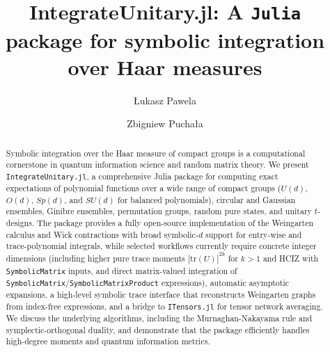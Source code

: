 \documentclass[manuscript,screen]{acmart}
\begin{document}
\title[IntegrateUnitary.jl]{IntegrateUnitary.jl: A \texttt{Julia} package for symbolic integration over Haar measures}

\author{{\L}ukasz Pawela}

\author{Zbigniew Pucha\l a}

\renewcommand{\shortauthors}{Pawela and Pucha\l a}

\begin{abstract}
Symbolic integration over the Haar measure of compact groups is a computational
cornerstone in quantum information science and random matrix theory. We present
\texttt{IntegrateUnitary.jl}, a comprehensive Julia package for computing exact expectations
of polynomial functions over a wide range of compact groups ($U(d)$, $O(d)$,
$Sp(d)$, and $SU(d)$ for balanced polynomials), circular and Gaussian ensembles,
Ginibre ensembles, permutation groups, random pure states, and unitary
$t$-designs. The package provides a fully open-source implementation of the
Weingarten calculus and Wick contractions with broad symbolic-$d$ support for
entry-wise and trace-polynomial integrals, while selected workflows currently
require concrete integer dimensions (including higher pure trace moments
$|\mathrm{tr}(U)|^{2k}$ for $k > 1$ and HCIZ with \texttt{SymbolicMatrix}
inputs, and direct matrix-valued integration of
\texttt{SymbolicMatrix}/\texttt{SymbolicMatrixProduct} expressions), automatic
asymptotic expansions, a high-level symbolic trace interface that reconstructs
Weingarten graphs from index-free expressions, and a bridge to
\texttt{ITensors.jl} for tensor network averaging. We discuss the underlying
algorithms, including the Murnaghan-Nakayama rule and symplectic-orthogonal
duality, and demonstrate that the package efficiently handles high-degree
moments and quantum information metrics.
\end{abstract}
\end{document}
